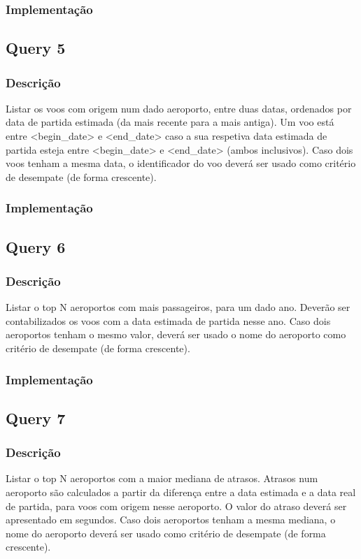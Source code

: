 \documentclass[11pt]{article}
\begin{document}
\subsubsection{Implementação}

\newpage
\subsection{Query 5}
\subsubsection{Descrição}

Listar os voos com origem num dado aeroporto, entre duas datas, ordenados por data de partida
estimada (da mais recente para a mais antiga). Um voo está entre <begin_date> e <end_date> caso a
sua respetiva data estimada de partida esteja entre <begin_date> e <end_date> (ambos inclusivos).
Caso dois voos tenham a mesma data, o identificador do voo deverá ser usado como critério de
desempate (de forma crescente).


\subsubsection{Implementação}

\subsection{Query 6}
\subsubsection{Descrição}
Listar o top N aeroportos com mais passageiros, para um dado ano. Deverão ser contabilizados
os voos com a data estimada de partida nesse ano. Caso dois aeroportos tenham o mesmo valor,
deverá ser usado o nome do aeroporto como critério de desempate (de forma crescente).

    
\subsubsection{Implementação}

\subsection{Query 7}
\subsubsection{Descrição}
Listar o top N aeroportos com a maior mediana de atrasos. Atrasos num aeroporto são calculados a partir da diferença entre a data estimada e a data real de partida, para voos com origem nesse
aeroporto. O valor do atraso deverá ser apresentado em segundos. Caso dois aeroportos tenham
a mesma mediana, o nome do aeroporto deverá ser usado como critério de desempate (de forma
crescente).
\end{document}

